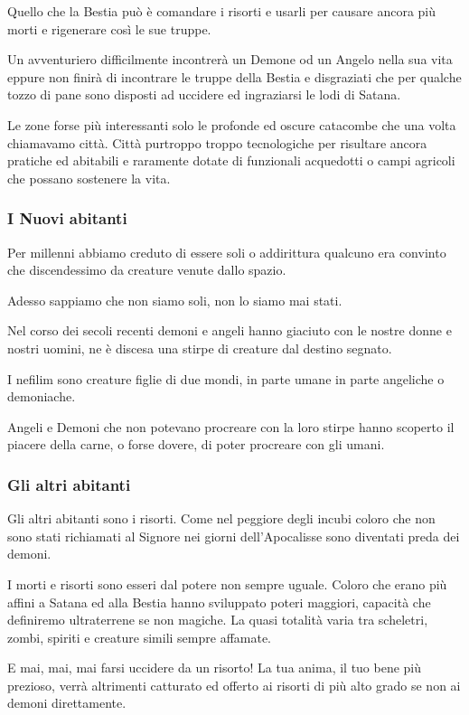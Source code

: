 \documentclass[12pt,a4paper,twoside,openany]{book}
\begin{document}
\begin{multicols}{2}
Quello che la Bestia può è comandare i risorti e usarli per causare ancora più morti e rigenerare così le sue truppe.

Un avventuriero difficilmente incontrerà un Demone od un Angelo nella sua vita eppure non finirà di incontrare le truppe della Bestia e disgraziati che per qualche tozzo di pane sono disposti ad uccidere ed ingraziarsi le lodi di Satana.

Le zone forse più interessanti solo le profonde ed oscure catacombe che una volta chiamavamo città.
Città purtroppo troppo tecnologiche per risultare ancora pratiche ed abitabili e raramente dotate di funzionali acquedotti o campi agricoli che possano sostenere la vita.

\subsubsection{I Nuovi abitanti}

Per millenni abbiamo creduto di essere soli o addirittura qualcuno era convinto che discendessimo da creature venute dallo spazio.

Adesso sappiamo che non siamo soli, non lo siamo mai stati.

Nel corso dei secoli recenti demoni e angeli hanno giaciuto con le nostre donne e nostri uomini, ne è discesa una stirpe di creature dal destino segnato.

I nefilim sono creature figlie di due mondi, in parte umane in parte angeliche o demoniache.

Angeli e Demoni che non potevano procreare con la loro stirpe hanno scoperto il piacere della carne, o forse dovere, di poter procreare con gli umani.

\subsubsection{Gli altri abitanti}

Gli altri abitanti sono i risorti. Come nel peggiore degli incubi coloro che non sono stati richiamati al Signore nei giorni dell'Apocalisse sono diventati preda dei demoni.

I morti e risorti sono esseri dal potere non sempre uguale. Coloro che erano più affini a Satana ed alla Bestia hanno sviluppato poteri maggiori, capacità che definiremo ultraterrene se non magiche. La quasi totalità varia tra scheletri, zombi, spiriti e creature simili sempre affamate.

E mai, mai, mai farsi uccidere da un risorto! La tua anima, il tuo bene più prezioso, verrà altrimenti catturato ed offerto ai risorti di più alto grado se non ai demoni direttamente.


\end{multicols}
\end{document}
